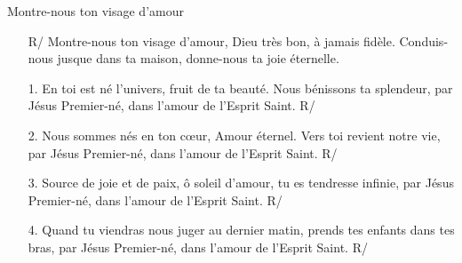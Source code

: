 Montre-nous ton visage d’amour
\begin{itemize}
\item[R/] Montre-nous ton visage d’amour, Dieu très bon, à jamais fidèle.
Conduis-nous jusque dans ta maison, donne-nous ta joie éternelle.
\item[1.]
En toi est né l'univers, fruit de ta beauté. Nous bénissons ta splendeur,
par Jésus Premier-né, dans l'amour de l'Esprit Saint. R/
\item[2.]
Nous sommes nés en ton cœur, Amour éternel. Vers toi revient notre vie,
par Jésus Premier-né, dans l'amour de l'Esprit Saint. R/
\item[3.]
Source de joie et de paix, ô soleil d'amour, tu es tendresse infinie,
par Jésus Premier-né, dans l'amour de l'Esprit Saint. R/
\item[4.]
Quand tu viendras nous juger au dernier matin, prends tes enfants dans
tes bras, par Jésus Premier-né, dans l'amour de l'Esprit Saint. R/
\end{itemize}
